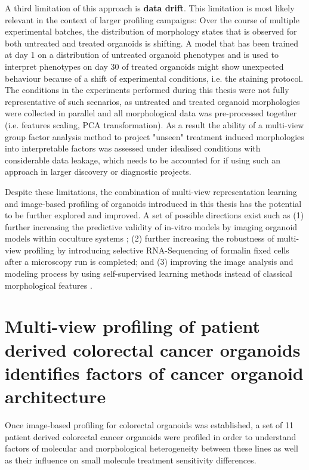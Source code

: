 \begin{flushleft}
A third limitation of this approach is \textbf{data drift}. This limitation is most likely relevant in the context of larger profiling campaigns: Over the course of multiple experimental batches, the distribution of morphology states that is observed for both untreated and treated organoids is shifting. A model that has been trained at day 1 on a distribution of untreated organoid phenotypes and is used to interpret phenotypes on day 30 of treated organoids might show unexpected behaviour because of a shift of experimental conditions, i.e. the staining protocol. The conditions in the experiments performed during this thesis were not fully representative of such scenarios, as untreated and treated organoid morphologies were collected in parallel and all morphological data was pre-processed together (i.e. features scaling, PCA transformation). As a result the ability of a multi-view group factor analysis method to project "unseen" treatment induced morphologies into interpretable factors was assessed under idealised conditions with considerable data leakage, which needs to be accounted for if using such an approach in larger discovery or diagnostic projects.
\par
\bigbreak

Despite these limitations, the combination of multi-view representation learning and image-based profiling of organoids introduced in this thesis has the potential to be further explored and improved. A set of possible directions exist such as (1) further increasing the predictive validity of in-vitro models by imaging organoid models within coculture systems \citep{cattaneoTumorOrganoidCell2020}; (2) further increasing the robustness of multi-view profiling by introducing selective RNA-Sequencing of formalin fixed cells after a microscopy run is completed; and (3) improving the image analysis and modeling process by using self-supervised learning methods instead of classical morphological features \citep{perakisContrastiveLearningSingleCell2021}.

\section{Multi-view profiling of patient derived colorectal cancer organoids identifies factors of cancer organoid architecture}

Once image-based profiling for colorectal organoids was established, a set of 11 patient derived colorectal cancer organoids were profiled in order to understand factors of molecular and morphological heterogeneity between these lines as well as their influence on small molecule treatment sensitivity differences.


\end{flushleft}
